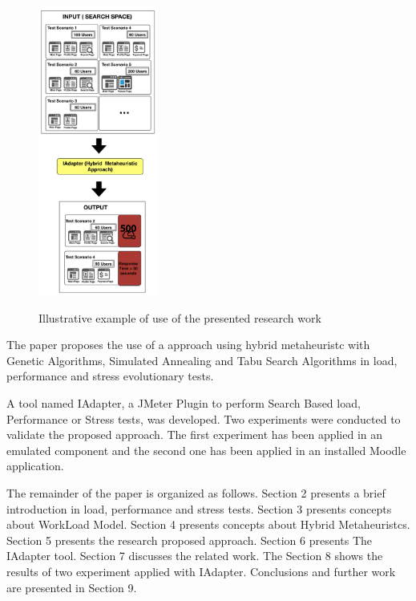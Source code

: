\begin{figure}[ht]
\centering
\caption{Illustrative example of use of the presented research work}
\includegraphics[width=0.35\textwidth]{./images/solution.png}
\label{fig:solution}
\end{figure}



%
%
%
The paper proposes the use of a approach using  hybrid metaheuristc  with  Genetic Algorithms, Simulated Annealing and Tabu Search Algorithms  in load, performance and stress evolutionary tests.

A tool named IAdapter, a JMeter Plugin to perform Search Based load, Performance or Stress tests, was developed. Two experiments were conducted to validate the proposed approach. The first experiment has been applied in an emulated component and the second one has been applied in an installed Moodle application.

The remainder of the paper is organized as follows. Section 2 presents a brief introduction in load, performance and stress tests. Section 3 presents concepts about WorkLoad Model. Section 4 presents concepts about Hybrid Metaheuristcs. Section 5 presents the research proposed approach. Section 6 presents The IAdapter tool. Section 7 discusses the related work. The Section 8 shows the results of two experiment applied with IAdapter. Conclusions and further work are presented in Section 9.